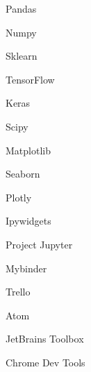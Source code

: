     \begin{cvskills}{4}{0}
                {\faPython}         %
                {                   %
                    \begin{cvitems}
                        \item {Pandas}
                        \item {Numpy}
                        \item {Sklearn}
                        \item {TensorFlow}
                        \item {Keras}
                        \item {Scipy}
                    \end{cvitems}
                }
                {\faLineChart}  %
                {               %
                    \begin{cvitems}
                        \item {Matplotlib}
                        \item {Seaborn}
                        \item {Plotly}
                        \item {Ipywidgets}
                    \end{cvitems}
                }
                {\faUsers}      %
                {               %
                    \begin{cvitems}
                        \item {Project Jupyter}
                        \item {Mybinder}
                        \item {Trello}
                    \end{cvitems}
                }
                {\faTools}      %
                {               %
                    \begin{cvitems}
                        \item {Atom}
                        \item {JetBrains Toolbox}
                        \item {Chrome Dev Tools}
                    \end{cvitems}
                }
    \end{cvskills}

